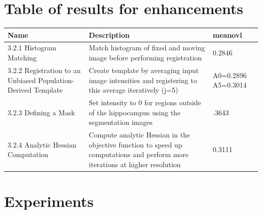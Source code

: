 \documentclass{article}
\begin{document}
\begin{par}
		
		\section{Table of results for enhancements}
		\begin{tabular}{|p{5cm}|p{8cm}|p{2cm}|}
			\hline
			Name & Description& meanovl \\ \hline \hline
			3.2.1 Histogram Matching & Match histogram of fixed and moving image before performing registration & 0.2846 \\ \hline
			3.2.2 Registration to an Unbiased Population-Derived Template & Create template by averaging input image intensities and registering to this average iteratively (j=5) & A0=0.2896 A5=0.3014\\ \hline
			3.2.3 Defining a Mask & Set intensity to 0 for regions outside of the hippocampus using the segmentation images & .3643 \\ \hline
			3.2.4 Analytic Hessian Computation & Compute analytic Hessian in the objective function to speed up computations and perform more iterations at higher resolution & 0.3111 \\ \hline
		\end{tabular}

		
		\section{Experiments}
		

\end{par}
\end{document}
